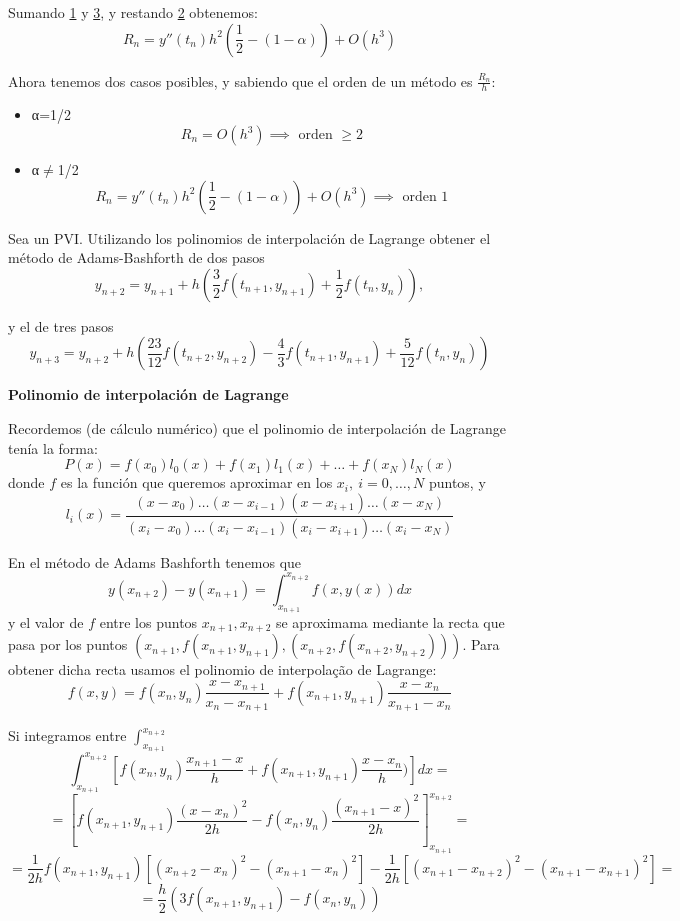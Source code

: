 \begin{problem}[5]
Sumando \hyperref[ej1-5_tresTerminos]{1} y \hyperref[ej1-5_tresTerminos]{3}, y restando \hyperref[ej1-5_tresTerminos]{2} obtenemos:
\[R_n = y''(t_n)h^2 \left(\frac{1}{2}-(1-α) \right)+O(h^3)\]


Ahora tenemos dos casos posibles, y sabiendo que el orden de un método es $\frac{R_n}{h}$:
\begin{itemize}
\item α=1/2
\[R_n=O(h^3) \implies \text{ orden } \geq 2\]
\item α$\neq$1/2
\[R_n = y''(t_n)h^2 \left(\frac{1}{2}-(1-α) \right) + O(h^3) \implies \text{ orden } 1\]
\end{itemize}

\end{problem}


\begin{problem}
	\ppart Sea un PVI. Utilizando los polinomios de interpolación de Lagrange obtener el método de Adams-Bashforth de dos pasos
	\[y_{n+2} = y_{n+1} + h \left( \frac{3}{2}f(t_{n+1}, y_{n+1}) + \frac{1}{2}f(t_n,y_n) \right),\]
	
	\ppart y el de tres pasos
	\[y_{n+3} = y_{n+2} + h \left( \frac{23}{12} f(t_{n+2},y_{n+2}) - \frac{4}{3} f(t_{n+1}, y_{n+1}) + \frac{5}{12}f(t_n,y_n) \right)\]
	
	\solution
	\begin{defn}{\textbf{Polinomio de interpolación de Lagrange}}

		Recordemos (de cálculo numérico) que el polinomio de interpolación de Lagrange tenía la forma:
		\[P(x) = f(x_0)l_0(x) + f(x_1)l_1(x) + … + f(x_N)l_N(x)\]
		donde $f$ es la función que queremos aproximar en los $x_i,\ i=0,…,N$ puntos, y
		\[l_i(x) = \frac{(x-x_0) … (x-x_{i-1}) (x-x_{i+1}) … (x-x_N)}{(x_i-x_0) … (x_i-x_{i-1}) (x_i-x_{i+1}) … (x_i-x_N)}\]
	\end{defn}

	\spart
	En el método de Adams Bashforth tenemos que
	\[y(x_{n+2})-y(x_{n+1}) = \int_{x_{n+1}}^{x_{n+2}} f(x,y(x)) dx\]
	y el valor de $f$ entre los puntos $x_{n+1}, x_{n+2}$ se aproximama mediante la recta que pasa por los puntos $(x_{n+1},f(x_{n+1},y_{n+1}), (x_{n+2}, f(x_{n+2},y_{n+2})))$. Para obtener dicha recta usamos el polinomio de interpolação de Lagrange:
	\[f(x,y) = f(x_n,y_n)\frac{x-x_{n+1}}{x_n-x_{n+1}} + f(x_{n+1},y_{n+1}) \frac{x-x_n}{x_{n+1}-x_n}\]

	Si integramos entre $\int_{x_{n+1}}^{x_{n+2}}$
	\[\int_{x_{n+1}}^{x_{n+2}} \left[ f(x_n,y_n)\frac{x_{n+1}-x}{h} + f(x_{n+1},y_{n+1})\frac{x-x_n}{h}) \right]dx =\]
	\[= \left[ f(x_{n+1},y_{n+1}) \frac{(x-x_n)^2}{2h} - f(x_n,y_n)\frac{(x_{n+1}-x)^2}{2h} \right]_{x_{n+1}}^{x_{n+2}}  =\]
	\[= \frac{1}{2h}f(x_{n+1},y_{n+1}) \left[ (x_{n+2}-x_n)^2 - (x_{n+1}-x_n)^2 \right] - \frac{1}{2h} \left[ (x_{n+1} - x_{n+2})^2 - (x_{n+1} - x_{n+1})^2 \right] =\]
	\[= \frac{h}{2} \left( 3f(x_{n+1},y_{n+1}) - f(x_n,y_n) \right)\]



\end{problem}
